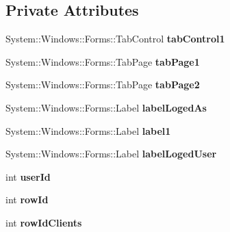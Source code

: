 \subsection*{Private Attributes}
\begin{DoxyCompactItemize}
\item 
\hypertarget{class_magazyn_1_1_magazin_a48725c278b730a1109d19f8fd1d47af3}{}\label{class_magazyn_1_1_magazin_a48725c278b730a1109d19f8fd1d47af3} 
System\+::\+Windows\+::\+Forms\+::\+Tab\+Control {\bfseries tab\+Control1}
\item 
\hypertarget{class_magazyn_1_1_magazin_a3ee69b550b516e3a3281cdeecae925be}{}\label{class_magazyn_1_1_magazin_a3ee69b550b516e3a3281cdeecae925be} 
System\+::\+Windows\+::\+Forms\+::\+Tab\+Page {\bfseries tab\+Page1}
\item 
\hypertarget{class_magazyn_1_1_magazin_ad3681050fcf43da9b3161b1ad213d66d}{}\label{class_magazyn_1_1_magazin_ad3681050fcf43da9b3161b1ad213d66d} 
System\+::\+Windows\+::\+Forms\+::\+Tab\+Page {\bfseries tab\+Page2}
\item 
\hypertarget{class_magazyn_1_1_magazin_ae98a3180838f14cf9bd9a5b26bee12d1}{}\label{class_magazyn_1_1_magazin_ae98a3180838f14cf9bd9a5b26bee12d1} 
System\+::\+Windows\+::\+Forms\+::\+Label {\bfseries label\+Loged\+As}
\item 
\hypertarget{class_magazyn_1_1_magazin_a428e10b9a7ad755171aac031ab9be10e}{}\label{class_magazyn_1_1_magazin_a428e10b9a7ad755171aac031ab9be10e} 
System\+::\+Windows\+::\+Forms\+::\+Label {\bfseries label1}
\item 
\hypertarget{class_magazyn_1_1_magazin_ac33bf0959c0af8afbb75bff51e295fc3}{}\label{class_magazyn_1_1_magazin_ac33bf0959c0af8afbb75bff51e295fc3} 
System\+::\+Windows\+::\+Forms\+::\+Label {\bfseries label\+Loged\+User}
\item 
\hypertarget{class_magazyn_1_1_magazin_a62d2a035714d6330fa4bd5895e407bda}{}\label{class_magazyn_1_1_magazin_a62d2a035714d6330fa4bd5895e407bda} 
int {\bfseries user\+Id}
\item 
\hypertarget{class_magazyn_1_1_magazin_ab7a9a6e5f3f2ed7ae362465273a1a737}{}\label{class_magazyn_1_1_magazin_ab7a9a6e5f3f2ed7ae362465273a1a737} 
int {\bfseries row\+Id}
\item 
\hypertarget{class_magazyn_1_1_magazin_ae3816cd62b5a5677494c27ed0d272d0d}{}\label{class_magazyn_1_1_magazin_ae3816cd62b5a5677494c27ed0d272d0d} 
int {\bfseries row\+Id\+Clients}
\item 
\hypertarget{class_magazyn_1_1_magazin_a5304f2d6f97ab888f20daafb2275bee8}{}\label{class_magazyn_1_1_magazin_a5304f2d6f97ab888f20daafb2275bee8} 

\end{DoxyCompactItemize}
